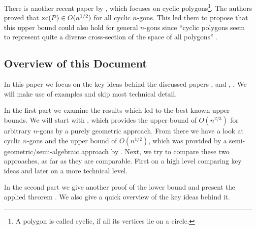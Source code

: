 There is another recent paper by \textcite{kwan2020extension}, which focuses on cyclic polygons\footnote{A polygon is called cyclic, if all its vertices lie on a circle.}. The authors proved that $\operatorname{xc}(P) \in O(n^{1/2})$ for all cyclic $n$-gons.
This led them to propose that this upper bound could also hold for general $n$-gons since ``cyclic polygons seem to represent quite a diverse cross-section of the space of all polygons'' \cite[p.\,3]{kwan2020extension}.



\subsection{Overview of this Document}

In this paper we focus on the key ideas behind the discussed papers , \textcite{shitov2020sublinear} and , \textcite{kwan2020extension}. We will make use of examples and skip most technical detail.

In the first part we examine the results which led to the best known upper bounds.
We will start with \textcite{shitov2020sublinear}, which provides the upper bound of $O(n^{2/3})$ for arbitrary $n$-gons by a purely geometric approach.
From there we have a look at cyclic $n$-gons and the upper bound of $O(n^{1/2})$, which was provided by a semi-geometric/semi-algebraic approach by \textcite{kwan2020extension}.
Next, we try to compare these two approaches, as far as they are comparable. First on a high level comparing key ideas and later on a more technical level.

In the second part we give another proof of the lower bound and present the applied theorem \cite[Theorem~1]{averkov2016maximum}. We also give a quick overview of the key ideas behind it.
